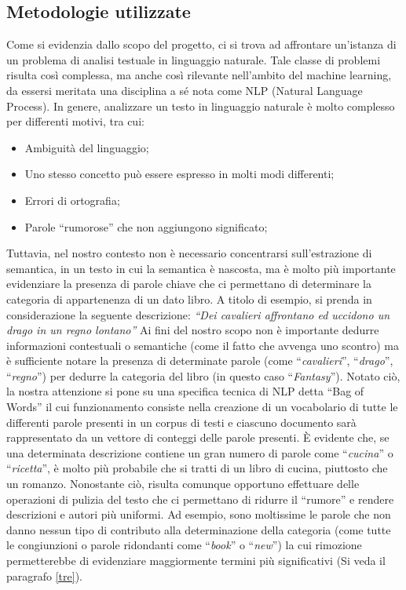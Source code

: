 \documentclass[12pt,oneside]{article}
\begin{document}
\begin{enumerate}
\subsection{Metodologie utilizzate}\label{due}
    \begin{justify}
        Come si evidenzia dallo scopo del progetto, ci si trova ad affrontare un’istanza di un problema di analisi testuale in linguaggio naturale. Tale classe di problemi risulta così complessa, ma anche così rilevante nell’ambito del machine learning, da essersi meritata una disciplina a sé nota come NLP (Natural Language Process). In genere, analizzare un testo in linguaggio naturale è molto complesso per differenti motivi, tra cui:
        \begin{itemize}
            \item Ambiguità del linguaggio;
            \item Uno stesso concetto può essere espresso in molti modi differenti;
            \item Errori di ortografia;
            \item Parole “rumorose” che non aggiungono significato;
        \end{itemize}
        Tuttavia, nel nostro contesto non è necessario concentrarsi sull’estrazione di semantica, in un testo in cui la semantica è nascosta, ma è molto più importante evidenziare la presenza di parole chiave che ci permettano di determinare la categoria di appartenenza di un dato libro. 
        A titolo di esempio, si prenda in considerazione la seguente descrizione: 
        \textit{“Dei cavalieri affrontano ed uccidono un drago in un regno lontano”}
        Ai fini del nostro scopo non è importante dedurre informazioni contestuali o semantiche (come il fatto che avvenga uno scontro) ma è sufficiente notare la presenza di determinate parole (come “\textit{cavalieri}”, “\textit{drago}”, “\textit{regno}”) per dedurre la categoria del libro (in questo caso “\textit{Fantasy}”).
        Notato ciò, la nostra attenzione si pone su una specifica tecnica di NLP detta “Bag of Words” il cui funzionamento consiste nella creazione di un vocabolario di tutte le differenti parole presenti in un corpus di testi e ciascuno documento sarà rappresentato da un vettore di conteggi delle parole presenti. È evidente che, se una determinata descrizione contiene un gran numero di parole come “\textit{cucina}” o “\textit{ricetta}”, è molto più probabile che si tratti di un libro di cucina, piuttosto che un romanzo.
        Nonostante ciò, risulta comunque opportuno effettuare delle operazioni di pulizia del testo che ci permettano di ridurre il “rumore” e rendere descrizioni e autori più uniformi. Ad esempio, sono moltissime le parole che non danno nessun tipo di contributo alla determinazione della categoria (come tutte le congiunzioni o parole ridondanti come “\textit{book}” o “\textit{new}”) la cui rimozione permetterebbe di evidenziare maggiormente termini più significativi (Si veda il paragrafo \ref{tre}).

    \end{justify}
\end{enumerate}
\end{document}
